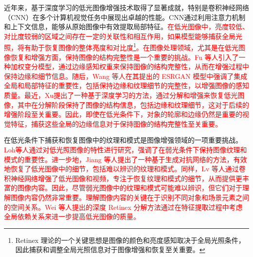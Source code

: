 \documentclass[a4paper, 10pt]{article}
\begin{document}
		
		近年来，基于深度学习的低光图像增强技术取得了显著成就，特别是卷积神经网络（CNN）在多个计算机视觉任务中展现出卓越的性能。CNN通过利用注意力机制\cite{yang2021locally,zhang2020attention}和上下文信息，能够从原始图像中有效提取局部特征\cite{jain1991unsupervised, lowe2004distinctive, ojala2002multiresolution}。\textcolor{red}{在低光图像中，亮度较低、对比度较弱的区域之间存在一定的关联性和相互作用，如果模型能够捕获全局光照，将有助于恢复图像的整体亮度和对比度\cite{chen2018learning, wang2013naturalness}\footnote{Retinex 理论的一个关键思想是图像的颜色和亮度感知取决于全局光照条件，因此捕获和调整全局光照信息对于图像增强和恢复至关重要。}。在图像处理领域，尤其是在低光图像恢复和增强方面，保持图像的结构完整性是一个重要的挑战。Fu 等人\cite{fu2016weighted}引入了一种加权变分模型，通过边缘感知权重来保持图像的结构完整性，从而在增强过程中保持边缘和细节信息。随后，Wang 等人\cite{wang2018esrgan}在其提出的 ESRGAN 模型中强调了集成全局和局部特征的重要性，包括保持边缘和纹理细节的完整性，以增强图像的感知质量。最近，Xu\cite{xu2020learning}提出了一种基于深度学习的方法，通过分解和增强来恢复低光图像，其中在分解阶段保持了图像的结构信息，包括边缘和纹理细节，这对于后续的增强阶段至关重要。因此，即使在低光条件下，对象的轮廓和边缘仍然是重要的视觉特征，捕获这些全局的边缘信息对于保持图像的结构完整性至关重要。}
		
		在低光条件下捕获和恢复图像中的纹理和模式是图像增强领域的一项重要挑战。\textcolor{red}{Loh等人\cite{loh2019getting}通过对低光照图像的特性进行研究，强调了在弱光条件下保持图像纹理和模式的重要性。进一步地，Jiang 等人\cite{jiang2021enlightengan}提出了一种基于生成对抗网络的方法，有效地恢复了低光图像中的细节，包括难以辨识的纹理和模式。同样，Lv 等人\cite{lv2018mbllen}通过卷积神经网络增强了低光图像和视频，专注于恢复纹理和模式的细节，从而提供更丰富的图像内容。因此，尽管弱光图像中的纹理和模式可能难以辨识，但它们对于理解图像内容仍然非常重要。理解图像内容的关键在于识别不同对象和场景元素之间的空间关系。Wei 等人\cite{wei2018deep}提出的深度 Retinex 分解方法通过在特征提取过程中考虑全局依赖关系来进一步提高低光图像的质量。}
		
\end{document}
